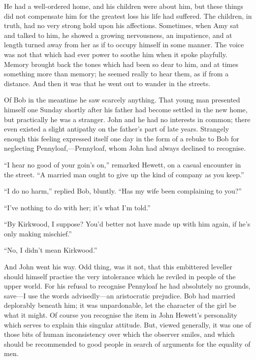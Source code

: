 He had a well-ordered home, and his children were about him, but these
things did not compensate him for the greatest loss his life {}had
suffered. The children, in truth, had no very strong hold upon his
affections. Sometimes, when Amy sat and talked to him, he showed a
growing nervousness, an impatience, and at length turned away from her
as if to occupy himself in some manner. The voice was not that which had
ever power to soothe him when it spoke playfully. Memory brought back
the tones which had been so dear to him, and at times something more
than memory; he seemed really to hear them, as if from a distance. And
then it was that he went out to wander in the streets.

Of Bob in the meantime he saw scarcely anything. That young man
presented himself one Sunday shortly after his father had become settled
in the new home, but practically he was a stranger. John and he had no
interests in common; there even existed a slight antipathy on the
father's part of late years. Strangely enough this feeling expressed
itself one day in the form of a rebuke to Bob for neglecting
Pennyloaf,---Pennyloaf, whom John had always declined to recognise.

{}``I hear no good of your goin's on,'' remarked Hewett, on a casual
encounter in the street. ``A married man ought to give up the kind of
company as you keep.''

``I do no harm,'' replied Bob, bluntly. ``Has my wife been complaining
to you?''

``I've nothing to do with her; it's what I'm told.''

``By Kirkwood, I suppose? You'd better not have made up with him again,
if he's only making mischief.''

``No, I didn't mean Kirkwood.''

And John went his way. Odd thing, was it not, that this embittered
leveller should himself practise the very intolerance which he reviled
in people of the upper world. For his refusal to recognise Pennyloaf he
had absolutely no grounds, save---I use the words advisedly---an
aristocratic prejudice. Bob had married deplorably beneath him; it was
unpardonable, let the character of the girl be what it might. Of course
you recognise the item in John Hewett's personality which serves to
explain this singular attitude. But, viewed {}generally, it was one of
those bits of human inconsistency over which the observer smiles, and
which should be recommended to good people in search of arguments for
the equality of men.


